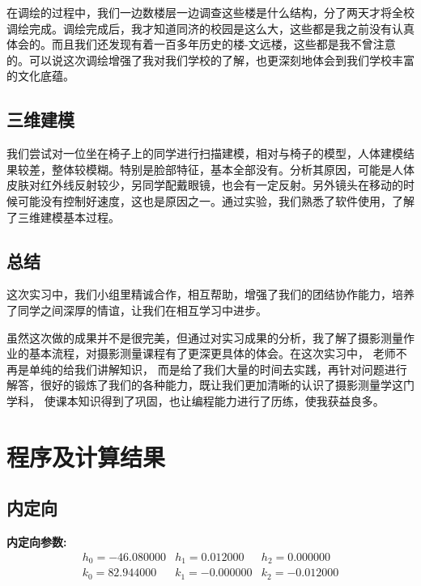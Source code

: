 在调绘的过程中，我们一边数楼层一边调查这些楼是什么结构，分了两天才将全校调绘完成。调绘完成后，我才知道同济的校园是这么大，这些都是我之前没有认真体会的。而且我们还发现有着一百多年历史的楼-文远楼，这些都是我不曾注意的。可以说这次调绘增强了我对我们学校的了解，也更深刻地体会到我们学校丰富的文化底蕴。

\subsection{三维建模}
我们尝试对一位坐在椅子上的同学进行扫描建模，相对与椅子的模型，人体建模结果较差，整体较模糊。特别是脸部特征，基本全部没有。分析其原因，可能是人体皮肤对红外线反射较少，另同学配戴眼镜，也会有一定反射。另外镜头在移动的时候可能没有控制好速度，这也是原因之一。通过实验，我们熟悉了软件使用，了解了三维建模基本过程。

\subsection{总结}
这次实习中，我们小组里精诚合作，相互帮助，增强了我们的团结协作能力，培养了同学之间深厚的情谊，让我们在相互学习中进步。

虽然这次做的成果并不是很完美，但通过对实习成果的分析，我了解了摄影测量作业的基本流程，对摄影测量课程有了更深更具体的体会。在这次实习中， 老师不再是单纯的给我们讲解知识， 而是给了我们大量的时间去实践，再针对问题进行解答，很好的锻炼了我们的各种能力，既让我们更加清晰的认识了摄影测量学这门学科， 使课本知识得到了巩固，也让编程能力进行了历练，使我获益良多。

\section{程序及计算结果}

\subsection{内定向}
\textbf{内定向参数:}
\begin{equation}
\begin{array}{lll}
h_0=-46.080000 & h_1=0.012000 & h_2=0.000000 \\
k_0=82.944000 & k_1=-0.000000 & k_2=-0.012000
\end{array}
\end{equation}

